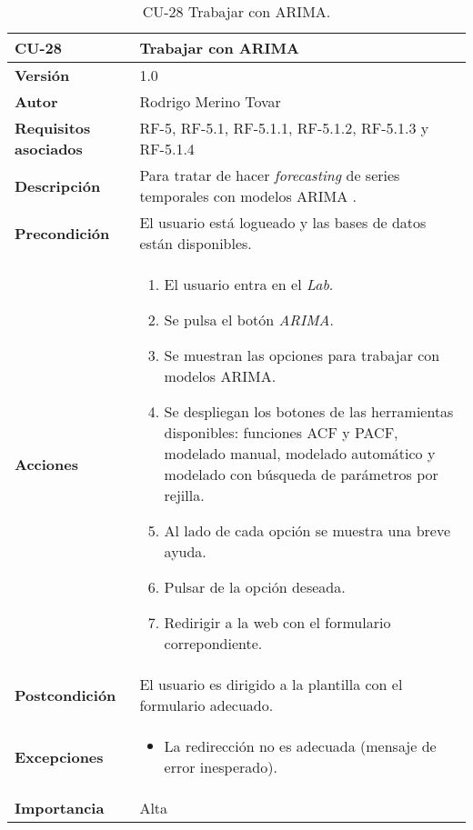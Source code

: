 \begin{table}[p]
	\centering
	\begin{tabularx}{\linewidth}{ p{} p{} }
		\toprule
		\textbf{CU-28}    & \textbf{Trabajar con ARIMA}\\
		\toprule
		\textbf{Versión}              & 1.0    \\
		\textbf{Autor}                & Rodrigo Merino Tovar \\
		\textbf{Requisitos asociados} & RF-5, RF-5.1, RF-5.1.1, RF-5.1.2, RF-5.1.3 y RF-5.1.4  \\
		\textbf{Descripción}          & Para tratar de hacer \emph{forecasting} de series temporales con modelos ARIMA .\\
		\textbf{Precondición}         & El usuario está logueado y las bases de datos están disponibles.  \\
		\textbf{Acciones}             &
		\begin{enumerate}
			\def\labelenumi{\arabic{enumi}.}
			\tightlist 
			\item El usuario entra en el \emph{Lab}.
			\item Se pulsa el botón \emph{ARIMA}.
			\item Se muestran las opciones para trabajar con modelos ARIMA. 
			\item Se despliegan los botones de las herramientas disponibles: funciones ACF y PACF, modelado manual, modelado automático y modelado con búsqueda de parámetros por rejilla. 
			\item Al lado de cada opción se muestra una breve ayuda. 
			\item Pulsar de la opción deseada.
			\item Redirigir a la web con el formulario correpondiente. 
		\end{enumerate}\\
		\textbf{Postcondición}        & El usuario es dirigido a la plantilla con el formulario adecuado. \\
		\textbf{Excepciones}          & 
		\begin{itemize}
			\tightlist
			\item La redirección no es adecuada (mensaje de error inesperado).
		\end{itemize} \\
		\textbf{Importancia}          & Alta \\
		\bottomrule
	\end{tabularx}
	\caption{CU-28 Trabajar con ARIMA.}
\end{table}


